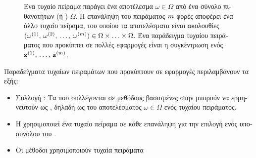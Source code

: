 {{\begin{figure}[H]
\begin{center}
	     	\end{center}
		{
		\caption{\foreignlanguage{greek}{Ένα τυχαίο πείραμα παράγει ένα αποτέλεσμα $\omega \in \Omega$ από ένα σύνολο πιθανοτήτων 
		(ή} ) $\Omega$. \foreignlanguage{greek}{Η επανάληψη του πειράματος $m$ φορές αποφέρει 
		ένα άλλο τυχαίο πείραμα, του οποίου τα αποτελέσματα είναι ακολουθίες 
		$(\omega^{(1)}, \,\omega^{(2)}, \,\dots, \,\omega^{(m)}) \in \Omega\times\ldots\times \Omega$. 
		Ένα παράδειγμα τυχαίου πειράματος που προκύπτει σε πολλές εφαρμογές}  \foreignlanguage{greek}{είναι 
		η συγκέντρωση ενός}  ${\bf z}^{(1)},\,\ldots,\,{\bf z}^{(m)}$. \label{fig_randomexperiment_dict}} }
	 	\end{figure} 
	 	\foreignlanguage{greek}{Παραδείγματα τυχαίων πειραμάτων που προκύπτουν σε εφαρμογές}  
		\foreignlanguage{greek}{περιλαμβάνουν τα εξής:} 
	 	\begin{itemize} 
			\item \foreignlanguage{greek}{Συλλογή} : \foreignlanguage{greek}{Τα}  
			\foreignlanguage{greek}{που συλλέγονται σε μεθόδους βασισμένες στην}  \foreignlanguage{greek}{μπορούν 
			να ερμηνευτούν ως} , \foreignlanguage{greek}{δηλαδή ως}  \foreignlanguage{greek}{του 
			αποτελέσματος $\omega \in \Omega$ ενός τυχαίου πειράματος.}
			\item \foreignlanguage{greek}{Η}  \foreignlanguage{greek}{χρησιμοποιεί ένα τυχαίο πείραμα σε κάθε 
			επανάληψη για την επιλογή ενός υποσυνόλου του} . 
			\item \foreignlanguage{greek}{Οι μέθοδοι}  \foreignlanguage{greek}{χρησιμοποιούν τυχαία πειράματα 
}
\end{itemize}}}
